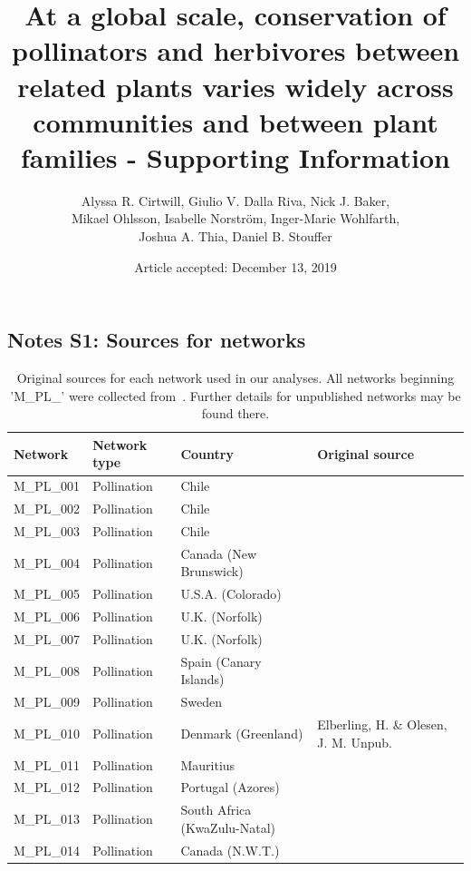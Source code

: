 \documentclass[12pt]{article}
\title{At a global scale, conservation of pollinators and herbivores between related plants varies widely across communities and between plant families - Supporting Information}
\author{Alyssa R. Cirtwill, Giulio V. Dalla Riva, Nick J. Baker,\\
Mikael Ohlsson, Isabelle Norstr\"{o}m, Inger-Marie Wohlfarth,\\
Joshua A. Thia, Daniel B. Stouffer}
\date{Article accepted: December 13, 2019}
\newcommand{\beginsupplement}{%
        \setcounter{table}{0}
        \renewcommand{\thetable}{S\arabic{table}}%
        \setcounter{figure}{0}
        \renewcommand{\thefigure}{S\arabic{figure}}%
     }
\begin{document}
\maketitle
\baselineskip=8.5mm
\begin{spacing}{1.5}

\beginsupplement
\clearpage

\section*{Notes S1: Sources for networks}
  \begin{table}[!h]
    \caption{Original sources for each network used in our analyses. All networks beginning 'M\_PL\_' were collected from~\citet{weboflife}. Further details for unpublished networks may be found there.}
    \label{sources}
    \begin{center}
    \begin{tabular}{|l l l m{8cm} |}
    \hline
    Network & Network type & Country & Original source  \\
    \hline
    M\_PL\_001  & Pollination & Chile & \citet{Arroyo1982}  \\
    M\_PL\_002  & Pollination & Chile & \citet{Arroyo1982}  \\
    M\_PL\_003  & Pollination & Chile & \citet{Arroyo1982}  \\
    M\_PL\_004  & Pollination & Canada (New Brunswick) & \citet{Barrett1987} \\
    M\_PL\_005  & Pollination & U.S.A. (Colorado) & \citet{Clements1923}  \\
    M\_PL\_006  & Pollination & U.K. (Norfolk) & \citet{Dicks2002} \\
    M\_PL\_007  & Pollination & U.K. (Norfolk) & \citet{Dicks2002} \\
    M\_PL\_008  & Pollination & Spain (Canary Islands) & \citet{Dupont2003}  \\
    M\_PL\_009  & Pollination & Sweden & \citet{Elberling1999} \\
    M\_PL\_010  & Pollination & Denmark (Greenland) & Elberling, H. \& Olesen, J. M. Unpub. \\
    M\_PL\_011  & Pollination & Mauritius & \citet{Olesen2002a}  \\
    M\_PL\_012  & Pollination & Portugal (Azores) & \citet{Olesen2002a}  \\
    M\_PL\_013  & Pollination & South Africa (KwaZulu-Natal) & \citet{Ollerton2003}  \\
    M\_PL\_014  & Pollination & Canada (N.W.T.) & \citet{Hocking1968} \\

\end{tabular}
\end{center}
\end{table}
\end{spacing}
\end{document}

